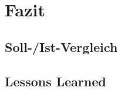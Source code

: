 \section{Fazit}
\label{sec:Fazit}

\subsection{Soll-/Ist-Vergleich}
\label{sec:SollIstVergleich}


\subsection{Lessons Learned}
\label{sec:LessonsLearned}

